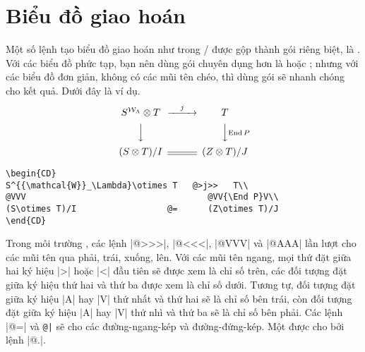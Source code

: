 \documentclass[11pt,leqno,titlepage,openany,oneside]{amsldoc}[1999/12/13]
\DeclareMathOperator{\End}{End}
\begin{document}
\chapter{Biểu đồ giao hoán}\label{s:commdiag}

Một số lệnh tạo biểu đồ giao hoán như trong \amstex/ được gộp thành 
gói riêng biệt, là . Với các biểu đồ phức tạp, bạn nên dùng gói
chuyên dụng hơn là  hoặc ; nhưng với các biểu đồ
đơn giản, không có các mũi tên chéo, thì dùng gói  sẽ nhanh
chóng cho kết quả. Dưới đây là ví dụ.
\begin{equation*}
\begin{CD}
S^{{\mathcal{W}}_\Lambda}\otimes T   @>j>>   T\\
@VVV                                    @VV{\End P}V\\
(S\otimes T)/I                  @=      (Z\otimes T)/J
\end{CD}
\end{equation*}
\begin{verbatim}
\begin{CD}
S^{{\mathcal{W}}_\Lambda}\otimes T   @>j>>   T\\
@VVV                                    @VV{\End P}V\\
(S\otimes T)/I                  @=      (Z\otimes T)/J
\end{CD}
\end{verbatim}
Trong môi trường , các lệnh |@>>>|, |@<<<|, |@VVV| và |@AAA|
lần lượt cho các mũi tên qua phải, trái, xuống, lên. Với các mũi tên ngang,
mọi thứ đặt giữa hai ký hiệu |>| hoặc |<| đầu tiên sẽ được xem là chỉ số trên,
các đối tượng đặt giữa ký hiệu thứ hai và thứ ba được xem là chỉ số dưới.
Tương tự, đối tượng đặt giữa ký hiệu |A| hay |V| thứ nhất và thứ hai
sẽ là chỉ số bên trái, còn đối tượng đặt giữa ký hiệu |A| hay |V| thứ nhì và
thứ ba sẽ là chỉ số bên phải. Các lệnh |@=| và \verb'@|'
sẽ cho các đường-ngang-kép và đường-đứng-kép. Một 
được cho bởi lệnh |@.|.
\end{document}
